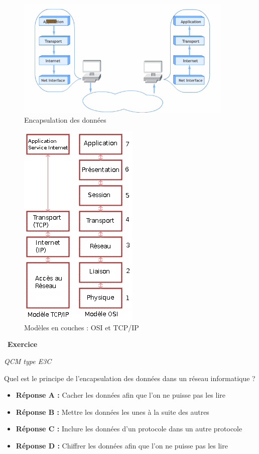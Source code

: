 \documentclass[
  11pt,
]{article}
\providecommand{\tightlist}{%
  \setlength{\itemsep}{0pt}\setlength{\parskip}{0pt}}
\newcounter{exo}
\newenvironment{exercice}[1]
{\par \medskip   \addtocounter{exo}{1} \noindent  
\begin{bclogo}[arrondi =0.1,   noborder = true, logo=\bccrayon, marge=4]{~\textbf{Exercice} \textbf{\theexo} {\itshape #1} }  \par}
{
\end{bclogo}
 \par \bigskip }
\begin{document}
\begin{figure}
\centering
\includegraphics{images/osi_couches.gif}
\caption{Encapsulation des données}
\end{figure}

\begin{figure}
\centering
\includegraphics{images/pileTCPIP2.png}
\caption{Modèles en couches : OSI et TCP/IP}
\end{figure}

\begin{exercice}{}

\emph{QCM type E3C}

Quel est le principe de l'encapsulation des données dans un réseau
informatique ?

\begin{itemize}
\tightlist
\item
  \textbf{Réponse A :} Cacher les données afin que l'on ne puisse pas
  les lire
\item
  \textbf{Réponse B :} Mettre les données les unes à la suite des autres
\item
  \textbf{Réponse C :} Inclure les données d'un protocole dans un autre
  protocole
\item
  \textbf{Réponse D :} Chiffrer les données afin que l'on ne puisse pas
  les lire
\end{itemize}

\end{exercice}
\end{document}
